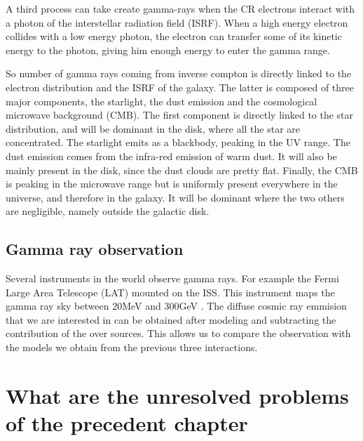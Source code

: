 A third process can take create gamma-rays when the CR electrons interact with a photon of the interstellar radiation field (ISRF). When a high energy electron collides with a low energy photon, the electron can transfer some of its kinetic energy to the photon, giving him enough energy to enter the gamma range.

So number of gamma rays coming from inverse compton is directly linked to the electron distribution and the ISRF of the galaxy. The latter is composed of three major components, the starlight, the dust emission and the cosmological microwave background (CMB). The first component is directly linked to the star distribution, and will be dominant in the disk, where all the star are concentrated. The starlight emits as a blackbody, peaking in the UV range. The dust emission comes from the infra-red emission of warm dust. It will also be mainly present in the disk, since the dust clouds are pretty flat. Finally, the CMB is peaking in the microwave range but is uniformly present everywhere in the universe, and therefore in the galaxy. It will be dominant where the two others are negligible, namely outside the galactic disk.






\subsection{Gamma ray observation}

Several instruments in the world observe gamma rays. For example the Fermi Large Area Telescope (LAT) mounted on the ISS. This instrument maps the gamma ray sky between 20MeV and 300GeV . The diffuse cosmic ray emmision that we are interested in can be obtained after modeling and subtracting the contribution of the over sources. This allows us to compare the observation with the models we obtain from the previous three interactions.



\section{What are the unresolved problems of the precedent chapter}
%	

